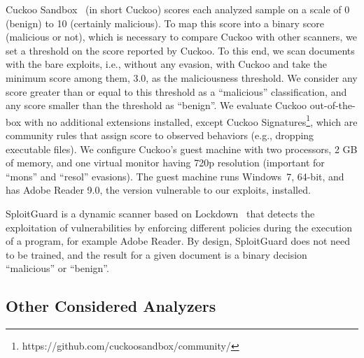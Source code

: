 Cuckoo Sandbox~\cite{guarnieri2013cuckoo} (in short Cuckoo) scores each analyzed sample on a scale of 0 (benign) to 10 (certainly malicious).
To map this score into a binary score (malicious or not), which is necessary to compare Cuckoo with other scanners, we set a threshold on the score reported by Cuckoo.
To this end, we scan documents with the bare exploits, i.e., without any evasion, with Cuckoo and take the minimum score among them, 3.0, as the maliciousness threshold.
We consider any score greater than or equal to this threshold as a ``malicious'' classification, and any score smaller than the threshold as ``benign''.
We evaluate Cuckoo out-of-the-box with no additional extensions installed, except Cuckoo Signatures\footnote{https://github.com/cuckoosandbox/community/}, which are community rules that assign score to observed behaviors (e.g., dropping executable files).
We configure Cuckoo's guest machine with two processors, 2 GB of memory, and one virtual monitor having 720p resolution (important for ``mons'' and ``resol'' evasions).
The guest machine runs Windows~7, 64-bit, and has Adobe Reader 9.0, the version vulnerable to our exploits, installed.

SploitGuard is a dynamic scanner based on Lockdown~\cite{payer2015fine} that detects the exploitation of vulnerabilities by enforcing different policies during the execution of a program, for example Adobe Reader. By design, SploitGuard does not need to be trained, and the result for a given document is a binary decision ``malicious'' or ``benign''.



\subsection{Other Considered Analyzers}
\label{sec:other analyzers}

